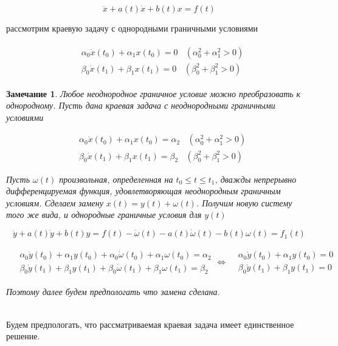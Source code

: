 \documentclass{article}
\theoremstyle{plain} \newtheorem*{theorem*}{Теорема}
\theoremstyle{plain} \newtheorem{theorem}{Теорема}[section]
\theoremstyle{defintition} \newtheorem*{corollary*}{Следствие}
\theoremstyle{plain} \newtheorem*{example*}{Пример}
\theoremstyle{plain} \newtheorem*{remark*}{Замечание}
\begin{document}
\begin{equation}
    \ddot{x} + a(t)\dot{x} + b(t)x = f(t)
\end{equation}

рассмотрим краевую задачу с однородными граничными условиями

\begin{gather}
\begin{split}
    & \alpha_0 \dot{x}(t_0) + \alpha_1 x(t_0) = 0
    \ \ \ \ (\alpha^2_0 + \alpha^2_1 > 0) \\
    & \beta_0 \dot{x}(t_1) + \beta_1 x(t_1) = 0
    \ \ \ \ (\beta^2_0 + \beta^2_1 > 0)
\end{split}
\end{gather}

\begin{remark*}
    Любое неоднородное граничное условие можно преобразовать
    к однородному. Пусть дана краевая задача с неоднородными
    граничными условиями

    \begin{align*}
    & \alpha_0 \dot{x}(t_0) + \alpha_1 x(t_0) = \alpha_2
        \ \ \ \ (\alpha^2_0 + \alpha^2_1 > 0) \\
    & \beta_0 \dot{x}(t_1) + \beta_1 x(t_1) = \beta_2
    \ \ \ \ (\beta^2_0 + \beta^2_1 > 0)
    \end{align*}

    Пусть $\omega(t)$ произвольная, определенная на
    $t_0 \le t \le t_1$, дважды непрерывно дифференцируемая
    функция, удовлетворяющая неоднородным граничным условиям.
    Сделаем замену $x(t) = y(t) + \omega(t)$. Получим
    новую систему того же вида, и однородные граничные
    условия для $y(t)$

    \begin{equation*}
        \ddot{y} + a(t)\dot{y} + b(t)y =
        f(t) - \ddot{\omega}(t) - a(t)\dot{\omega}(t) -
        b(t)\omega(t) = f_1(t)
    \end{equation*}

    \begin{gather*}
        \begin{aligned}
            & \alpha_0 \dot{y}(t_0) + \alpha_1 y(t_0) +
            \alpha_0 \dot{\omega}(t_0) + \alpha_1 \omega(t_0)
            = \alpha_2 \\
            & \beta_0 \dot{y}(t_1) + \beta_1 y(t_1) +
            \beta_0 \dot{\omega}(t_1) + \beta_1 \omega(t_1)
            = \beta_2
        \end{aligned}
        \iff
        \begin{aligned}
            & \alpha_0 \dot{y}(t_0) + \alpha_1 y(t_0) = 0 \\
            & \beta_0 \dot{y}(t_1) + \beta_1 y(t_1) = 0
        \end{aligned}
    \end{gather*}

    Поэтому далее будем предпологать что замена сделана.

\end{remark*}
\mbox{} \\
Будем предпологать, что рассматриваемая краевая задача
имеет единственное решение.
\end{document}
